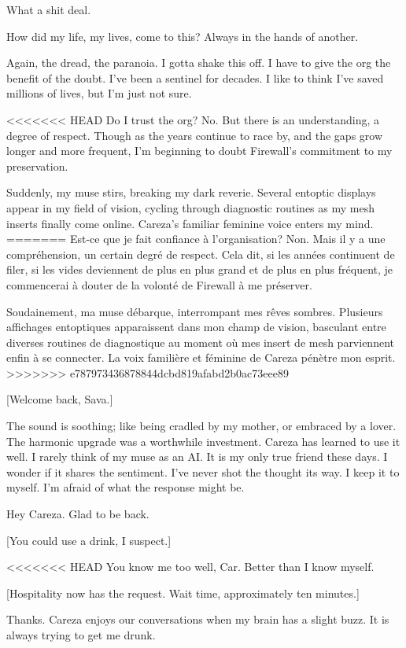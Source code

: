 What a shit deal. 

How did my life, my lives, come to this? Always in the hands of another. 

Again, the dread, the paranoia. I gotta shake this off. I have to give the org the benefit of the doubt. I've been a sentinel for decades. I like to think I've saved millions of lives, but I'm just not sure. 

<<<<<<< HEAD
Do I trust the org? No. But there is an understanding, a degree of respect. Though as the years continue to race by, and the gaps grow longer and more frequent, I'm beginning to doubt Firewall's commitment to my preservation. 

Suddenly, my muse stirs, breaking my dark reverie. Several entoptic displays appear in my field of vision, cycling through diagnostic routines as my mesh inserts finally come online. Careza's familiar feminine voice enters my mind. 
=======
Est-ce que je fait confiance à l'organisation? Non. Mais il y a une compréhension, un certain degré de respect. Cela dit, si les années continuent de filer, si les vides deviennent de plus en plus grand et de plus en plus fréquent, je commencerai à douter de la volonté de Firewall à me préserver. 

Soudainement, ma muse débarque, interrompant mes rêves sombres. Plusieurs affichages entoptiques apparaissent dans mon champ de vision, basculant entre diverses routines de diagnostique au moment où mes insert de mesh parviennent enfin à se connecter. La voix familière et féminine de Careza pénètre mon esprit. 
>>>>>>> e787973436878844dcbd819afabd2b0ac73eee89

[Welcome back, Sava.] 

The sound is soothing; like being cradled by my mother, or embraced by a lover. The harmonic upgrade was a worthwhile investment. Careza has learned to use it well. I rarely think of my muse as an AI. It is my only true friend these days. I wonder if it shares the sentiment. I've never shot the thought its way. I keep it to myself. I'm afraid of what the response might be. 

Hey Careza. Glad to be back. 

[You could use a drink, I suspect.] 

<<<<<<< HEAD
You know me too well, Car. Better than I know myself. 

[Hospitality now has the request. Wait time, approximately ten minutes.] 

Thanks. Careza enjoys our conversations when my brain has a slight buzz. It is always trying to get me drunk. 

